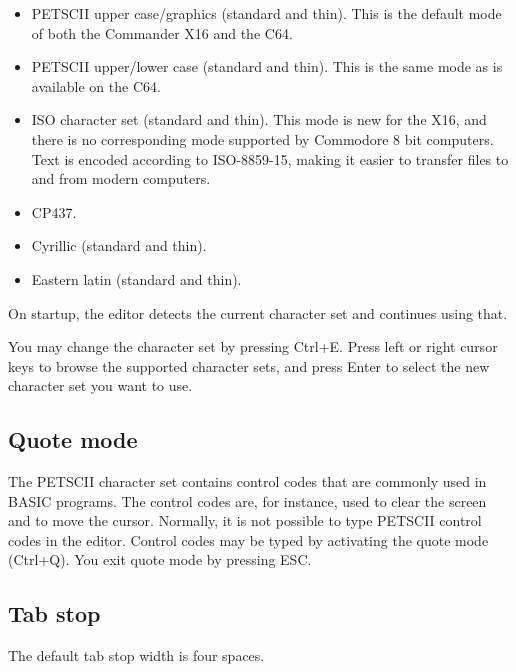 \documentclass{article}
\begin{document}
        \begin{itemize}
            \item PETSCII upper case/graphics (standard and thin). This is the default mode of both the Commander X16 and the C64.

            \item PETSCII upper/lower case (standard and thin). This is the same mode as is available on the C64.

            \item ISO character set (standard and thin). This mode is new for the X16, and there is no corresponding mode 
            supported by Commodore 8 bit computers. Text is encoded according to ISO-8859-15, making it
            easier to transfer files to and from modern computers.

            \item CP437.

            \item Cyrillic (standard and thin).

            \item Eastern latin (standard and thin).
            
        \end{itemize}

        On startup, the editor detects the current character set and continues using that.

        You may change the character set by pressing Ctrl+E. Press left or right cursor keys to
        browse the supported character sets, and press Enter to select the new character set you want to use.
    
    \subsection{Quote mode}
        The PETSCII character set contains control codes that are commonly used in BASIC programs. The
        control codes are, for instance, used to clear the screen and to move the cursor. Normally, it is not
        possible to type PETSCII control codes in the editor. Control codes may
        be typed by activating the quote mode (Ctrl+Q). You exit quote mode by pressing ESC.

    \subsection{Tab stop}
        The default tab stop width is four spaces. 
        
\end{document}
